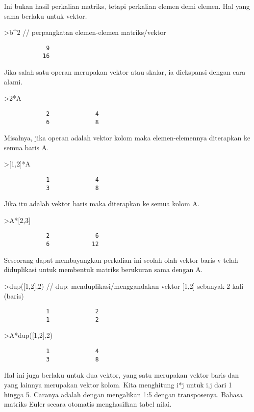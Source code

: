 \documentclass[
]{book}
\begin{document}
Ini bukan hasil perkalian matriks, tetapi perkalian elemen demi elemen. Hal yang sama berlaku untuk vektor.

\textgreater b\^{}2 // perpangkatan elemen-elemen matriks/vektor

\begin{verbatim}
            9 
           16 
\end{verbatim}

Jika salah satu operan merupakan vektor atau skalar, ia diekspansi dengan cara alami.

\textgreater2*A

\begin{verbatim}
            2             4 
            6             8 
\end{verbatim}

Misalnya, jika operan adalah vektor kolom maka elemen-elemennya diterapkan ke semua baris A.

\textgreater{[}1,2{]}*A

\begin{verbatim}
            1             4 
            3             8 
\end{verbatim}

Jika itu adalah vektor baris maka diterapkan ke semua kolom A.

\textgreater A*{[}2,3{]}

\begin{verbatim}
            2             6 
            6            12 
\end{verbatim}

Seseorang dapat membayangkan perkalian ini seolah-olah vektor baris v telah diduplikasi untuk membentuk matriks berukuran sama dengan A.

\textgreater dup({[}1,2{]},2) // dup: menduplikasi/menggandakan vektor {[}1,2{]} sebanyak 2 kali (baris)

\begin{verbatim}
            1             2 
            1             2 
\end{verbatim}

\textgreater A*dup({[}1,2{]},2)

\begin{verbatim}
            1             4 
            3             8 
\end{verbatim}

Hal ini juga berlaku untuk dua vektor, yang satu merupakan vektor baris dan yang lainnya merupakan vektor kolom. Kita menghitung i*j untuk i,j dari 1 hingga 5. Caranya adalah dengan mengalikan 1:5 dengan transposenya. Bahasa matriks Euler secara otomatis menghasilkan tabel nilai.
\end{document}
